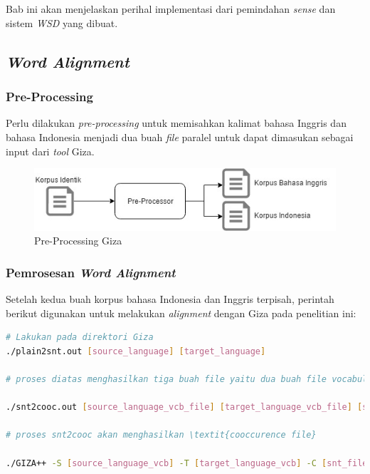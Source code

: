 \chapter{\babEmpat} \label{implementasi}
Bab ini akan menjelaskan perihal implementasi dari pemindahan \textit{sense} dan sistem \textit{WSD} yang dibuat.


\section{\textit{Word Alignment}}

\subsection{Pre-Processing}
Perlu dilakukan \textit{pre-processing} untuk memisahkan kalimat bahasa Inggris dan bahasa Indonesia menjadi dua buah \textit{file} paralel untuk dapat dimasukan sebagai input dari \textit{tool} Giza.

\begin{figure}
	\centering
	\includegraphics[width=1\linewidth]{adit_pics/pre-process-giza}
	\caption{Pre-Processing Giza}
	\label{fig:Pre-Processing-Giza}
\end{figure}

\subsection{Pemrosesan \textit{Word Alignment}}
Setelah kedua buah korpus bahasa Indonesia dan Inggris terpisah, perintah berikut digunakan untuk melakukan \textit{alignment} dengan Giza pada penelitian ini:

\begin{lstlisting}[language=bash,caption={Word Alignment}, label={word-alignment}]
# Lakukan pada direktori Giza
./plain2snt.out [source_language] [target_language]

# proses diatas menghasilkan tiga buah file yaitu dua buah file vocabulary yang berisi indeks dengan kata (bahasa asal, dan bahasa tujuan), dan satu buah file snt yang berisi \textit{alignment} dari kalimat.

./snt2cooc.out [source_language_vcb_file] [target_language_vcb_file] [snt_file] > [coocurrence_file]

# proses snt2cooc akan menghasilkan \textit{cooccurence file}

./GIZA++ -S [source_language_vcb] -T [target_language_vcb] -C [snt_file] -CoocurrenceFile [cooc_file]
\end{lstlisting}

